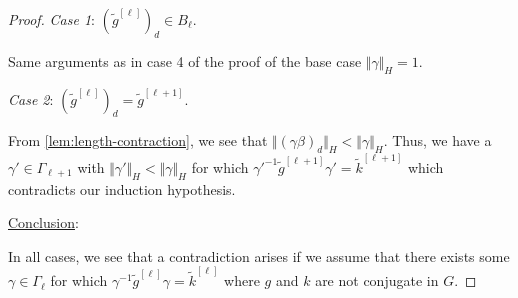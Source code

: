 \documentclass[10pt,a4paper]{amsart}
\newcommand{\absH}[1]{\Vert #1 \Vert_H}
\newcommand{\bigAbsH}[1]{\bigl\Vert #1 \bigr\Vert_H}
\begin{document}
\begin{proof}
\medskip

\noindent\textit{Case 1}: $(\widetilde{g}^{[\ell]})_d\in B_\ell$.
\nopagebreak

\nopagebreak\smallskip
\nopagebreak\noindent
Same arguments as in case 4 of the proof of the base case $\absH{\gamma}=1$.

\medskip

\noindent\textit{Case 2}: $(\widetilde{g}^{[\ell]})_d = \widetilde{g}^{[\ell+1]}$.
\nopagebreak

\nopagebreak\smallskip
\nopagebreak\noindent
From \cref{lem:length-contraction}, we see that $\bigAbsH{(\gamma\beta)_d}< \absH{\gamma}$.
Thus, we have a $\gamma'\in \Gamma_{\ell+1}$ with $\absH{\gamma'}< \absH{\gamma}$ for which $\gamma'^{-1} \widetilde{g}^{[\ell+1]}\gamma' = \widetilde{k}^{[\ell+1]}$ which contradicts our induction hypothesis.

\medskip

\noindent\underline{Conclusion}:
\nopagebreak

\nopagebreak\smallskip
\nopagebreak\noindent
In all cases, we see that a contradiction arises if we assume that there exists some $\gamma\in \Gamma_{\ell}$ for which $\gamma^{-1} \widetilde{g}^{[\ell]}\gamma = \widetilde{k}^{[\ell]}$ where $g$ and $k$ are not conjugate in $G$.
\end{proof}
\end{document}
